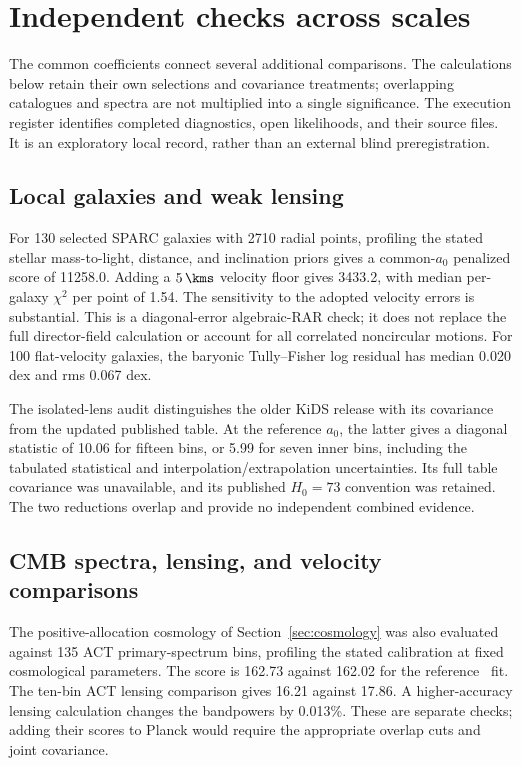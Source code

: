 \section{Independent checks across scales}

The common coefficients connect several additional comparisons. The
calculations below retain their own selections and covariance treatments;
overlapping catalogues and spectra are not multiplied into a single
significance. The execution register identifies completed diagnostics,
open likelihoods, and their source files. It is an exploratory local
record, rather than an external blind preregistration. 

\subsection{Local galaxies and weak lensing}
For 130 selected SPARC galaxies with 2710 radial points, profiling the
stated stellar mass-to-light, distance, and inclination priors gives a
common-$a_0$ penalized score of 11258.0. Adding a
$5\,\kms$ velocity floor gives 3433.2, with median per-galaxy
$\chi^2$ per point of 1.54. The sensitivity to the adopted velocity
errors is substantial. This is a diagonal-error algebraic-RAR check;
it does not replace the full director-field calculation or account for
all correlated noncircular motions. For 100 flat-velocity galaxies,
the baryonic Tully--Fisher log residual has median 0.020 dex and rms
0.067 dex. 

The isolated-lens audit distinguishes the older KiDS release with its
covariance from the updated published table. At the reference $a_0$,
the latter gives a diagonal statistic of 10.06 for fifteen bins, or
5.99 for seven inner bins, including the tabulated statistical and
interpolation/extrapolation uncertainties. Its full table covariance
was unavailable, and its published $H_0=73$ convention was retained.
The two reductions overlap and provide no independent combined evidence.

\subsection{CMB spectra, lensing, and velocity comparisons}
The positive-allocation cosmology of Section~\ref{sec:cosmology} was
also evaluated against 135 ACT primary-spectrum bins, profiling the
stated calibration at fixed cosmological parameters. The score is
162.73 against 162.02 for the reference \LCDM\ fit. The ten-bin ACT
lensing comparison gives 16.21 against 17.86. A higher-accuracy
lensing calculation changes the bandpowers by 0.013\%. These are
separate checks; adding their scores to Planck would require the
appropriate overlap cuts and joint covariance. 

